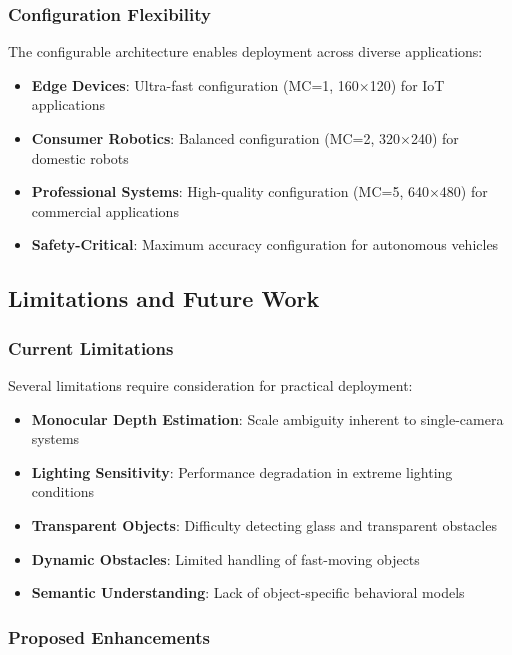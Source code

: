 \documentclass[10pt]{article}
\begin{document}
\subsubsection{Configuration Flexibility}

The configurable architecture enables deployment across diverse applications:

\begin{itemize}
\item \textbf{Edge Devices}: Ultra-fast configuration (MC=1, 160$\times$120) for IoT applications
\item \textbf{Consumer Robotics}: Balanced configuration (MC=2, 320$\times$240) for domestic robots
\item \textbf{Professional Systems}: High-quality configuration (MC=5, 640$\times$480) for commercial applications
\item \textbf{Safety-Critical}: Maximum accuracy configuration for autonomous vehicles
\end{itemize}

\subsection{Limitations and Future Work}

\subsubsection{Current Limitations}

Several limitations require consideration for practical deployment:

\begin{itemize}
\item \textbf{Monocular Depth Estimation}: Scale ambiguity inherent to single-camera systems
\item \textbf{Lighting Sensitivity}: Performance degradation in extreme lighting conditions
\item \textbf{Transparent Objects}: Difficulty detecting glass and transparent obstacles
\item \textbf{Dynamic Obstacles}: Limited handling of fast-moving objects
\item \textbf{Semantic Understanding}: Lack of object-specific behavioral models
\end{itemize}

\subsubsection{Proposed Enhancements}
\end{document}
